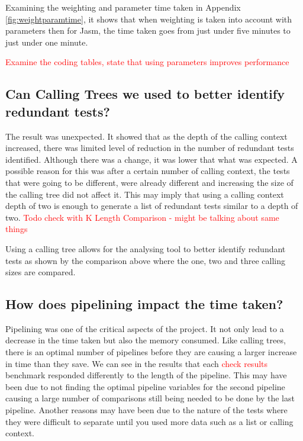 \documentclass[11pt
              , a4paper
              , twoside
              , openright
              ]{report}
\newcommand\todo[1]{\textcolor{red}{#1}}
\begin{document}
Examining the weighting and parameter time taken in Appendix \ref{fig:weightparamtime}, it shows that when weighting is taken into account with parameters then for Jasm, the time taken goes from just under five minutes to just under one minute.

\todo{Examine the coding tables, state that using parameters improves performance}

\subsection{Can Calling Trees we used to better identify redundant tests?}

The result was unexpected. It showed that as the depth of the calling context increased, there was limited level of reduction in the number of redundant tests identified. Although there was a change, it was lower that what was expected. A possible reason for this was after a certain number of calling context, the tests that were going to be different, were already different and increasing the size of the calling tree did not affect it. This may imply that using a calling context depth of two is enough to generate a list of redundant tests similar to a depth of two. \todo{Todo check with K Length Comparison - might be talking about same things}

Using a calling tree allows for the analysing tool to better identify redundant tests as shown by the comparison above where the one, two and three calling sizes are compared.

\subsection{How does pipelining impact the time taken?}

Pipelining was one of the critical aspects of the project. It not only lead to a decrease in the time taken but also the memory consumed. Like calling trees, there is an optimal number of pipelines before they are causing a larger increase in time than they save. We can see in the results that each \todo{check results} benchmark responded differently to the length of the pipeline. This may have been due to not finding the optimal pipeline variables for the second pipeline causing a large number of comparisons still being needed to be done by the last pipeline. Another reasons may have been due to the nature of the tests where they were difficult to separate until you used more data such as a list or calling context. 
\end{document}
